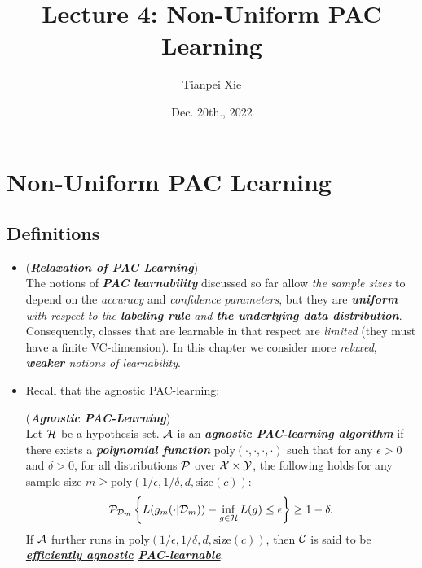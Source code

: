 \documentclass[11pt]{article}
\begin{document}
\title{Lecture 4: Non-Uniform PAC Learning}
\author{ Tianpei Xie}
\date{Dec. 20th., 2022}
\maketitle
\tableofcontents
\newpage
\section{Non-Uniform PAC Learning}
\subsection{Definitions}
\begin{itemize}
\item \begin{remark} (\emph{\textbf{Relaxation of PAC Learning}})\\
The notions of \emph{\textbf{PAC learnability}} discussed so far allow \emph{the sample sizes} to depend on the \emph{accuracy} and \emph{confidence parameters}, but they are \emph{\textbf{uniform} with respect to the \textbf{labeling rule} and \textbf{the underlying data distribution}}. Consequently, classes that are learnable in that respect are \emph{limited} (they must have a finite VC-dimension). In this chapter we consider more \emph{relaxed}, \emph{\textbf{weaker} notions of learnability}. 
\end{remark}

\item Recall that the agnostic PAC-learning:
 \begin{definition} (\emph{\textbf{Agnostic PAC-Learning}})\\
Let ${\mathcal H}$ be a hypothesis set. ${\mathcal A}$ is an \underline{\emph{\textbf{agnostic PAC-learning algorithm}}} if there
exists a \emph{\textbf{polynomial function}} $\text{poly}(\cdot, \cdot, \cdot, \cdot)$  such that for any $\epsilon > 0$ and $\delta > 0$,
for all distributions ${\mathcal P}$ over ${\mathcal X} \times {\mathcal Y}$, the following holds for any sample size $m \ge \text{poly}(1/\epsilon, 1/\delta, d, \text{size}(c))$:
\begin{align}
{\mathcal P}_{{\mathcal D}_m}\left\{L(g_m(\cdot| {\mathcal D}_{m})) - \inf_{g \in {\mathcal H}}L(g)  \le \epsilon \right\} \ge 1 - \delta. \label{eqn: agnostic_pac_definition}
\end{align} If ${\mathcal A}$ further runs in $\text{poly}(1/\epsilon, 1/\delta, d, \text{size}(c))$, then ${\mathcal C}$ is said to be \emph{\textbf{\underline{efficiently agnostic} \underline{PAC-learnable}}}. 
\end{definition}


\end{itemize}
\end{document}
